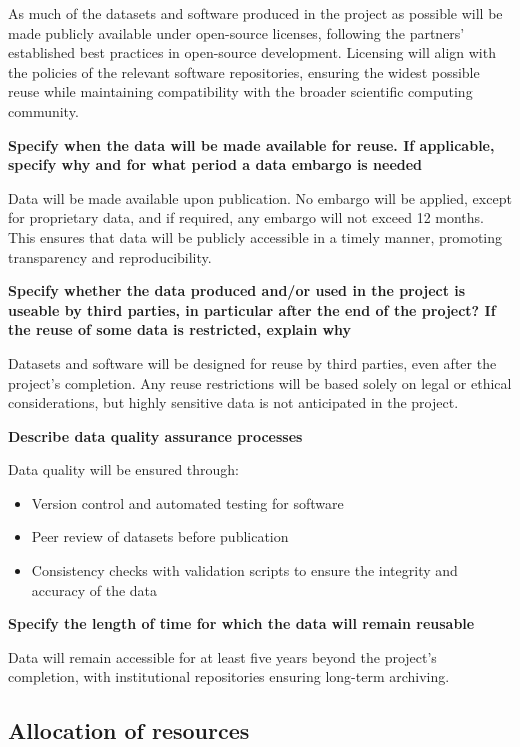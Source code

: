 \documentclass[a4paper,12pt]{article}
\begin{document}
As much of the datasets and software produced in the project as possible will be made publicly available under open-source licenses, following the partners' established best practices in open-source development. Licensing will align with the policies of the relevant software repositories, ensuring the widest possible reuse while maintaining compatibility with the broader scientific computing community. 

\noindent \textbf{Specify when the data will be made available for reuse. If applicable, specify why and for what period a data embargo is needed}

Data will be made available upon publication. No embargo will be applied, except for proprietary data, and if required, any embargo will not exceed 12 months. This ensures that data will be publicly accessible in a timely manner, promoting transparency and reproducibility.

\noindent \textbf{Specify whether the data produced and/or used in the project is useable by third parties, in particular after the end of the project? If the reuse of some data is restricted, explain why}

Datasets and software will be designed for reuse by third parties, even after the project's completion. Any reuse restrictions will be based solely on legal or ethical considerations, but highly sensitive data is not anticipated in the project.

\noindent \textbf{Describe data quality assurance processes}

Data quality will be ensured through:
\begin{itemize}
\item Version control and automated testing for software
\item Peer review of datasets before publication
\item Consistency checks with validation scripts to ensure the integrity and accuracy of the data
\end{itemize}

\noindent\textbf{Specify the length of time for which the data will remain reusable} 

Data will remain accessible for at least five years beyond the project's completion, with institutional repositories ensuring long-term archiving. 

\subsection{Allocation of resources}
\end{document}
